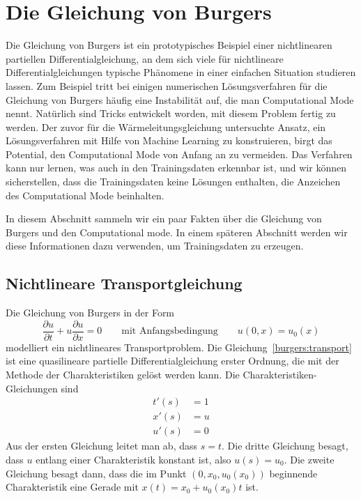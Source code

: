 %
%
%
\section{Die Gleichung von Burgers\label{section:burgersallg}}
Die Gleichung von Burgers ist ein prototypisches Beispiel einer nichtlinearen
partiellen Differentialgleichung, an dem sich viele für nichtlineare
Differentialgleichungen typische Phänomene in einer einfachen Situation
studieren lassen.
Zum Beispiel tritt bei einigen numerischen Lösungsverfahren für die
Gleichung von Burgers häufig eine Instabilität auf, die man 
Computational Mode nennt.
Natürlich sind Tricks entwickelt worden, mit diesem Problem fertig
zu werden.
Der zuvor für die Wärmeleitungsgleichung untersuchte Ansatz, ein
Lösungsverfahren mit Hilfe von Machine Learning zu konstruieren, birgt
das Potential, den Computational Mode von Anfang an zu vermeiden.
Das Verfahren kann nur lernen, was auch in den Trainingsdaten
erkennbar ist, und wir können sicherstellen, dass die Trainingsdaten
keine Lösungen enthalten, die Anzeichen des Computational Mode beinhalten.

In diesem Abschnitt sammeln wir ein paar Fakten über die Gleichung 
von Burgers und den Computational mode.
In einem späteren Abschnitt werden wir diese Informationen dazu
verwenden, um Trainingsdaten zu erzeugen.

\subsection{Nichtlineare Transportgleichung\label{subsection:nichtlineare}}
Die Gleichung von Burgers in der Form
\begin{equation}
\frac{\partial u}{\partial t} + u\frac{\partial u}{\partial x}=0
\qquad\text{mit Anfangsbedingung}\qquad
u(0,x) = u_0(x)
\label{burgers:transport}
\end{equation}
modelliert ein nichtlineares Transportproblem.
Die Gleichung~\eqref{burgers:transport} ist eine quasilineare partielle
Differentialgleichung erster Ordnung, die mit der Methode der
Charakteristiken \cite{burgers:pde} gelöst werden kann.
Die Charakteristiken-Gleichungen sind
\begin{align*}
t'(s)&=1
\\ 
x'(s)&=u
\\
u'(s)&=0
\end{align*}
Aus der ersten Gleichung leitet man ab, dass $s=t$.
Die dritte Gleichung besagt, dass $u$ entlang einer Charakteristik konstant
ist, also $u(s)=u_0$.
Die zweite Gleichung besagt dann, dass die im Punkt $(0,x_0,u_0(x_0))$
beginnende Charakteristik eine Gerade mit $x(t)=x_0 + u_0(x_0)t$ ist.

